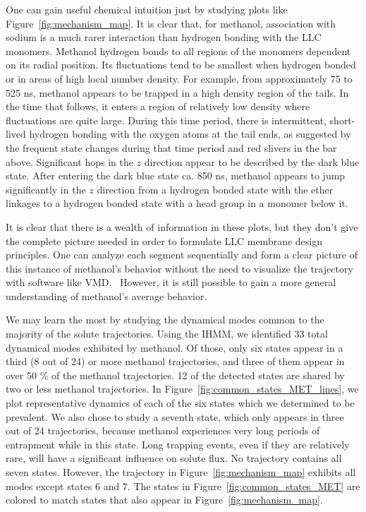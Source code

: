 \documentclass[journal=jpcbfk,manuscript=article]{achemso}
\begin{document}
  One can gain useful chemical intuition just by studying plots like
  Figure~\ref{fig:mechanism_map}. It is clear that, for methanol, association 
  with sodium is a much rarer interaction than hydrogen bonding with the 
  LLC monomers. Methanol hydrogen bonds to all regions of the monomers dependent
  on its radial position. Its fluctuations tend to be smallest when hydrogen bonded
  or in areas of high local number density. For example, from approximately 75 to 
  525 ns, methanol appears to be trapped in a high density region of the tails.
  In the time that follows, it enters a region of relatively low density where 
  fluctuations are quite large. During this time period, there is intermittent, 
  short-lived hydrogen bonding with the oxygen atoms at the tail ends, as suggested
  by the frequent state changes during that time period and red slivers in the bar
  above. Significant hops in the $z$ direction appear to be described by the dark blue
  state. After entering the dark blue state ca. 850 ns, methanol appears to jump
  significantly in the $z$ direction from a hydrogen bonded state with the ether 
  linkages to a hydrogen bonded state with a head group in a monomer below it.

  It is clear that there is a wealth of information in these plots, but they don't give
  the complete picture needed in order to formulate LLC membrane design principles. One
  can analyze each segment sequentially and form a clear picture of this instance of 
  methanol's behavior without the need to visualize the trajectory with software like VMD.~\cite{humphrey_vmd:_1996}
  However, it is still possible to gain a more general understanding of methanol's average
  behavior.
  
  We may learn the most by studying the dynamical modes common to the majority of 
  the solute trajectories. Using the IHMM, we identified 33 total dynamical modes 
  exhibited by methanol. Of those, only six states appear in a third (8 out of 24) 
  or more methanol trajectories, and three of them appear in over 50 \% of the 
  methanol trajectories. 12 of the detected states are shared by two or less 
  methanol trajectories. In Figure~\ref{fig:common_states_MET_lines}, we plot 
  representative dynamics of each of the six states which we determined to be prevalent.
  We also chose to study a seventh state, which only appears in three out of
  24 trajectories, because methanol experiences very long periods of entrapment
  while in this state. Long trapping events, even if they are relatively rare, will
  have a significant influence on solute flux. No trajectory contains all seven states.
  However, the trajectory in Figure~\ref{fig:mechanism_map} exhibits all modes except
  states 6 and 7. The states in Figure~\ref{fig:common_states_MET} are colored to match
  states that also appear in Figure~\ref{fig:mechanism_map}.
  
\end{document}
